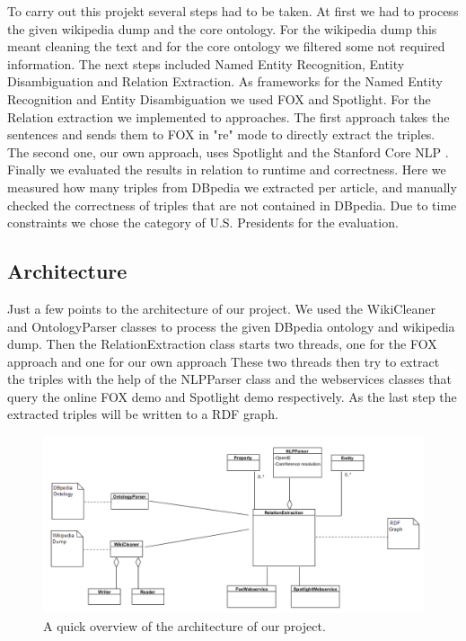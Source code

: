\documentclass[runningheads]{llncs}
\begin{document}
To carry out this projekt several steps had to be taken. At first we had to process the given wikipedia dump and the core ontology. For the wikipedia dump this meant cleaning the text and for the core ontology we filtered some not required information. The next steps included Named Entity Recognition, Entity Disambiguation and Relation Extraction.
As frameworks for the Named Entity Recognition and Entity Disambiguation we used FOX and Spotlight. For the Relation extraction we implemented to approaches. The first approach takes the sentences and sends them to FOX in "re" mode to directly extract the triples. The second one, our own approach, uses Spotlight and the Stanford Core NLP \cite{stanford}. Finally we evaluated the results in relation to runtime and correctness. Here we measured how many triples from DBpedia we extracted per article, and manually checked the correctness of triples that are not contained in DBpedia. Due to time constraints we chose the category of U.S. Presidents for the evaluation.

\subsection{Architecture}
Just a few points to the architecture of our project. We used the WikiCleaner and OntologyParser classes to process the given DBpedia ontology and wikipedia dump. Then the RelationExtraction class starts two threads, one for the FOX approach and one for our own approach These two threads then try to extract the triples with the help of the NLPParser class and the webservices classes that query the online FOX demo and Spotlight demo respectively. As the last step the extracted triples will be written to a RDF graph.

\begin{figure}
\includegraphics[width=\textwidth]{architecture.png}
\caption{A quick overview of the architecture of our project.} \label{fig1}
\end{figure}
\end{document}
